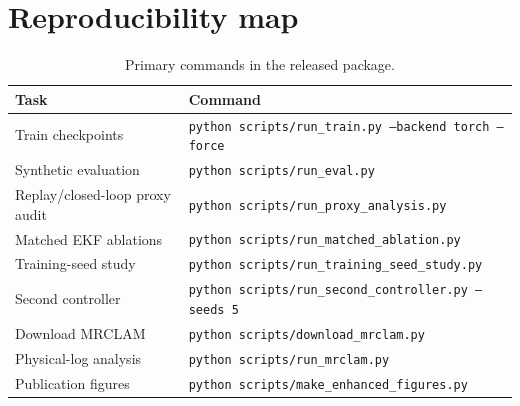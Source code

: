 \documentclass{article}
\begin{document}
\section{Reproducibility map}
\begin{table}[h]
\centering
\caption{Primary commands in the released package.}
\small
\begin{tabularx}{\linewidth}{lX}
\toprule
Task & Command\\
\midrule
Train checkpoints & \texttt{python scripts/run\_train.py --backend torch --force}\\
Synthetic evaluation & \texttt{python scripts/run\_eval.py}\\
Replay/closed-loop proxy audit & \texttt{python scripts/run\_proxy\_analysis.py}\\
Matched EKF ablations & \texttt{python scripts/run\_matched\_ablation.py}\\
Training-seed study & \texttt{python scripts/run\_training\_seed\_study.py}\\
Second controller & \texttt{python scripts/run\_second\_controller.py --seeds 5}\\
Download MRCLAM & \texttt{python scripts/download\_mrclam.py}\\
Physical-log analysis & \texttt{python scripts/run\_mrclam.py}\\
Publication figures & \texttt{python scripts/make\_enhanced\_figures.py}\\
\bottomrule
\end{tabularx}
\end{table}
\end{document}
